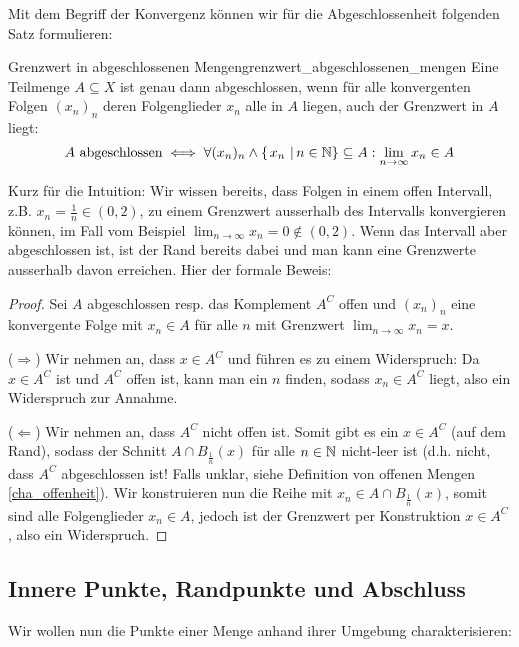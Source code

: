 Mit dem Begriff der Konvergenz können wir für die Abgeschlossenheit folgenden Satz formulieren:
\begin{satz}{Grenzwert in abgeschlossenen Mengen}{grenzwert_abgeschlossenen_mengen}
Eine Teilmenge $A \subseteq X$ ist genau dann abgeschlossen, wenn für alle konvergenten Folgen $(x_n)_n$ deren Folgenglieder $x_n$ alle in $A$ liegen, auch der Grenzwert in $A$ liegt:
$$A \text{ abgeschlossen} \iff \forall (x_n)_n \land \left\{\left.x_n \ \right| n\in \mathbb{N} \right\} \subseteq A: \lim_{n \to \infty} x_n \in A $$
\end{satz}
Kurz für die Intuition: Wir wissen bereits, dass Folgen in einem offen Intervall, z.B. $x_n = \frac{1}{n} \in (0,2)$, zu einem Grenzwert ausserhalb des Intervalls konvergieren können, im Fall vom Beispiel $\lim_{n \to \infty}x_n = 0 \notin (0,2)$. Wenn das Intervall aber abgeschlossen ist, ist der Rand bereits dabei und man kann eine Grenzwerte ausserhalb davon erreichen. Hier der formale Beweis:
\begin{proof}
Sei $A$ abgeschlossen resp. das Komplement $A^C$ offen und $(x_n)_n$ eine konvergente Folge mit $x_n \in A$ für alle $n$ mit Grenzwert $\lim_{n \to \infty}x_n = x$.

($\Longrightarrow$) Wir nehmen an, dass $x \in A^C$ und führen es zu einem Widerspruch: Da $x \in A^C$ ist und $A^C$ offen ist, kann man ein $n$ finden, sodass $x_n \in A^C$ liegt, also ein Widerspruch zur Annahme.

($\Longleftarrow$) Wir nehmen an, dass $A^C$ nicht offen ist. Somit gibt es ein $x \in A^C$ (auf dem Rand), sodass der Schnitt $A \cap B_{\frac{1}{n}}(x)$ für alle $n \in \mathbb{N}$ nicht-leer ist (d.h. nicht, dass $A^C$ abgeschlossen ist! Falls unklar, siehe Definition von offenen Mengen \ref{cha_offenheit}). Wir konstruieren nun die Reihe mit $x_n \in A \cap B_{\frac{1}{n}}(x)$, somit sind alle Folgenglieder $x_n \in A$, jedoch ist der Grenzwert per Konstruktion $x \in A^C$, also ein Widerspruch.
\end{proof}

\subsection{Innere Punkte, Randpunkte und Abschluss}
Wir wollen nun die Punkte einer Menge anhand ihrer Umgebung charakterisieren:

